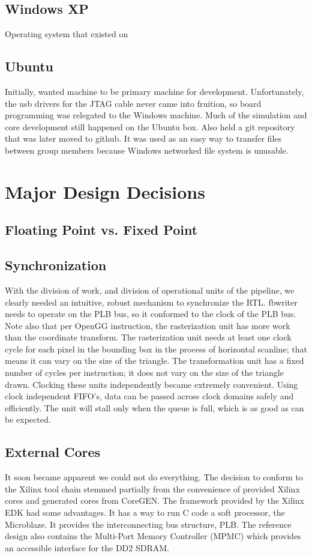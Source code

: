 \documentclass[letterpaper,10pt]{article}
\begin{document}
\subsection{Windows XP}
Operating system that existed on 

\subsection{Ubuntu}
Initially, wanted machine to be primary machine for development.  Unfortunately, the usb drivers for the JTAG cable never came into fruition, so board programming was relegated to the Windows machine.  Much of the simulation and core development still happened on the Ubuntu box.  Also held a git repository that was later moved to github.  It was used as an easy way to transfer files between group members because Windows networked file system is unusable.  


\section{Major Design Decisions}
\subsection{Floating Point vs. Fixed Point}

\subsection{Synchronization}
With the division of work, and division of operational units of the pipeline, we clearly needed an intuitive, robust mechanism to synchronize the RTL.  fbwriter needs to operate on the PLB bus, so it conformed to the clock of the PLB bus.  Note also that per OpenGG instruction, the rasterization unit has more work than the coordinate transform.  The rasterization unit needs at least one clock cycle for each pixel in the bounding box in the process of horizontal scanline; that means it can vary on the size of the triangle.  The transformation unit has a fixed number of cycles per instruction; it does not vary on the size of the triangle drawn.  Clocking these units independently became extremely convenient.  Using clock independent FIFO's, data can be passed across clock domains safely and efficiently.  The unit will stall only when the queue is full, which is as good as can be expected.

\subsection{External Cores}
It soon became apparent we could not do everything. The decision to conform to the Xilinx tool chain stemmed partially from the convenience of provided Xilinx cores and generated cores from CoreGEN.  The framework provided by the Xilinx EDK had some advantages.  It has a way to run C code a soft processor, the Microblaze.  It provides the interconnecting bus structure, PLB.  The reference design also contains the Multi-Port Memory Controller (MPMC) which provides an accessible interface for the DD2 SDRAM.  
\end{document}
